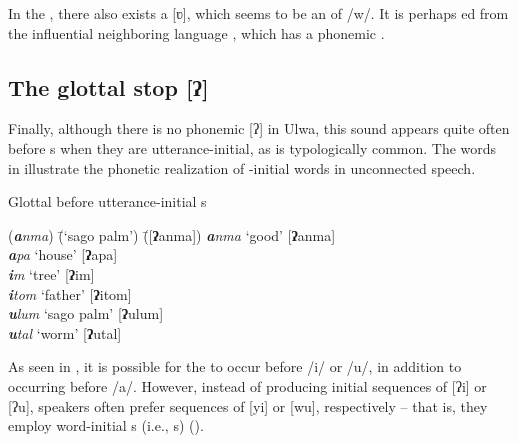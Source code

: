   In the  , there also exists a   [ʋ], which seems to be an  of /w/. It is perhaps ed from the influential neighboring language , which has a phonemic    \citep[60]{McElvenny2006}.


\subsection{The glottal stop [ʔ]}\label{sec:2.1.8}


Finally, although there is no phonemic   [ʔ] in Ulwa, this sound appears quite often before s when they are utterance-initial, as is typologically common. The words in  illustrate the phonetic realization of -initial words in unconnected speech.

\ea%
    \label{ex:phon:43}
          Glottal  before utterance-initial s\\
\begin{tabbing}
{(\textit{\textbf{a}nma})} \= {(‘sago palm’)} \= {([\textbf{ʔ}anma])}\kill
{\textit{\textbf{a}nma}} \> {‘good’} \> {[\textbf{ʔ}anma]}\\
{\textit{\textbf{a}pa}} \> {‘house’} \> {[\textbf{ʔ}apa]}\\
{\textit{\textbf{i}m}} \> {‘tree’} \> {[\textbf{ʔ}im]}\\
{\textit{\textbf{i}tom}} \> {‘father’} \> {[\textbf{ʔ}itom]}\\
{\textit{\textbf{u}lum}} \> {‘sago palm’} \> {[\textbf{ʔ}ulum]}\\
{\textit{\textbf{u}tal}} \> {‘worm’} \> {[\textbf{ʔ}utal]}
\end{tabbing}
\z

As seen in , it is possible for the   to occur before /i/ or /u/, in addition to occurring before /a/. However, instead of producing initial sequences of [ʔi] or [ʔu], speakers often prefer sequences of [yi] or [wu], respectively -- that is, they employ word-initial  s (i.e.,  s) ().

